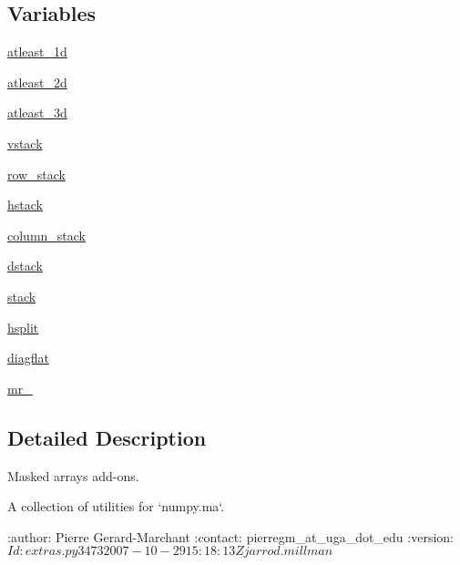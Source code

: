 \subsection*{Variables}
\begin{DoxyCompactItemize}
\item 
\hyperlink{namespacenumpy_1_1ma_1_1extras_ab31d10be3bc17b9af3b9ce3c0a9dae93}{atleast\+\_\+1d}
\item 
\hyperlink{namespacenumpy_1_1ma_1_1extras_a2fbdd6e7e48b9ff445f3aa4eaf896200}{atleast\+\_\+2d}
\item 
\hyperlink{namespacenumpy_1_1ma_1_1extras_a5420bbfc05793a448ce13b13637be052}{atleast\+\_\+3d}
\item 
\hyperlink{namespacenumpy_1_1ma_1_1extras_a5f30747f079a25fb4363e2106a8b75ff}{vstack}
\item 
\hyperlink{namespacenumpy_1_1ma_1_1extras_ac78fb9304e8cd121aaa34b307456f069}{row\+\_\+stack}
\item 
\hyperlink{namespacenumpy_1_1ma_1_1extras_a10ef8e5d31825741baf10a118fd9ded5}{hstack}
\item 
\hyperlink{namespacenumpy_1_1ma_1_1extras_abbf88f073197d9a90126858dc7a106d8}{column\+\_\+stack}
\item 
\hyperlink{namespacenumpy_1_1ma_1_1extras_a536f249bd2ddb7255982b60dd1a45df1}{dstack}
\item 
\hyperlink{namespacenumpy_1_1ma_1_1extras_ace361e716c4f9cbad3510a0696b88b9f}{stack}
\item 
\hyperlink{namespacenumpy_1_1ma_1_1extras_a350e3c880adea8bd7a6646ad7aef096e}{hsplit}
\item 
\hyperlink{namespacenumpy_1_1ma_1_1extras_ad3cfdc4e472146253dd235d8c5ddb9a5}{diagflat}
\item 
\hyperlink{namespacenumpy_1_1ma_1_1extras_a31167c810dd2da10e34f5459afad5073}{mr\+\_\+}
\end{DoxyCompactItemize}


\subsection{Detailed Description}
\begin{DoxyVerb}Masked arrays add-ons.

A collection of utilities for `numpy.ma`.

:author: Pierre Gerard-Marchant
:contact: pierregm_at_uga_dot_edu
:version: $Id: extras.py 3473 2007-10-29 15:18:13Z jarrod.millman $\end{DoxyVerb}
 

